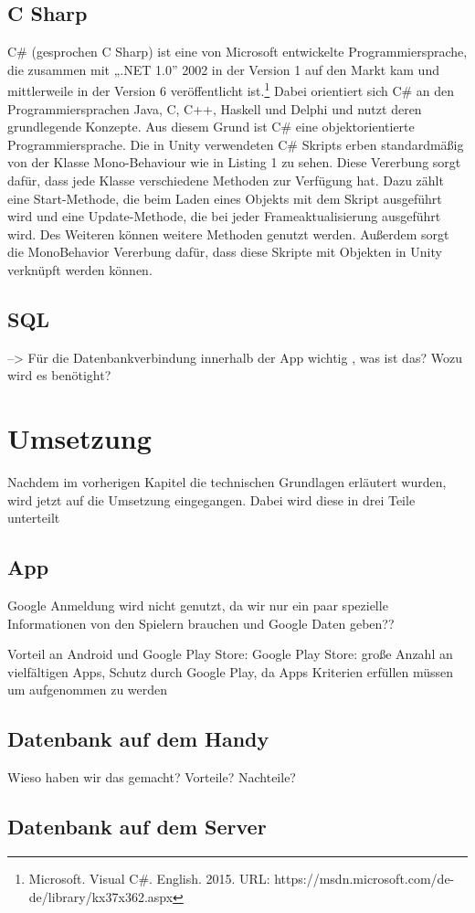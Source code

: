 \section{C Sharp}

C\# (gesprochen C Sharp) ist eine von Microsoft entwickelte Programmiersprache, die zusammen mit „.NET 1.0” 2002 in der Version 1 auf den Markt kam und mittlerweile in der Version 6 veröffentlicht ist.\footnote{Microsoft. Visual C#. English. 2015. URL: https://msdn.microsoft.com/de-de/library/kx37x362.aspx} Dabei orientiert sich C\# an den Programmiersprachen Java, C, C++, Haskell und Delphi und nutzt deren grundlegende Konzepte. Aus diesem Grund ist C\# eine objektorientierte Programmiersprache. Die in Unity verwendeten C\# Skripts erben standardmäßig von der Klasse Mono-Behaviour wie in Listing 1 zu sehen. Diese Vererbung sorgt dafür, dass jede Klasse verschiedene Methoden zur Verfügung hat. Dazu zählt eine Start-Methode, die beim Laden eines Objekts mit dem Skript ausgeführt wird und eine Update-Methode, die bei jeder Frameaktualisierung ausgeführt wird. Des Weiteren können weitere Methoden genutzt werden. Außerdem sorgt die MonoBehavior Vererbung dafür, dass diese Skripte mit Objekten in Unity verknüpft werden können.

\section{SQL}

	--> Für die Datenbankverbindung innerhalb der App wichtig , was ist das? Wozu wird es benötight?


\chapter{Umsetzung}

	Nachdem im vorherigen Kapitel die technischen Grundlagen erläutert wurden, wird jetzt auf die Umsetzung eingegangen. Dabei wird diese in drei Teile unterteilt

\section{App}
	Google Anmeldung wird nicht genutzt, da wir nur ein paar spezielle Informationen von den Spielern brauchen und Google Daten geben??
	
	Vorteil an Android und Google Play Store: Google Play Store: große Anzahl an vielfältigen Apps, Schutz durch Google Play, da Apps Kriterien erfüllen müssen um aufgenommen zu werden

\section{Datenbank auf dem Handy}
	Wieso haben wir das gemacht? Vorteile? Nachteile?
	
\section{Datenbank auf dem Server}
